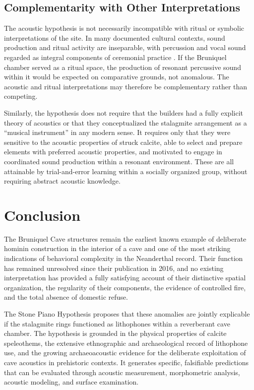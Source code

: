 \documentclass[12pt]{article}
\begin{document}
\subsection{Complementarity with Other Interpretations}

The acoustic hypothesis is not necessarily incompatible with ritual or symbolic interpretations of the site. In many documented cultural contexts, sound production and ritual activity are inseparable, with percussion and vocal sound regarded as integral components of ceremonial practice \citep{Needham1967, Blacking1973}. If the Bruniquel chamber served as a ritual space, the production of resonant percussive sound within it would be expected on comparative grounds, not anomalous. The acoustic and ritual interpretations may therefore be complementary rather than competing.

Similarly, the hypothesis does not require that the builders had a fully explicit theory of acoustics or that they conceptualized the stalagmite arrangement as a ``musical instrument'' in any modern sense. It requires only that they were sensitive to the acoustic properties of struck calcite, able to select and prepare elements with preferred acoustic properties, and motivated to engage in coordinated sound production within a resonant environment. These are all attainable by trial-and-error learning within a socially organized group, without requiring abstract acoustic knowledge.

\section{Conclusion}

The Bruniquel Cave structures remain the earliest known example of deliberate hominin construction in the interior of a cave and one of the most striking indications of behavioral complexity in the Neanderthal record. Their function has remained unresolved since their publication in 2016, and no existing interpretation has provided a fully satisfying account of their distinctive spatial organization, the regularity of their components, the evidence of controlled fire, and the total absence of domestic refuse.

The Stone Piano Hypothesis proposes that these anomalies are jointly explicable if the stalagmite rings functioned as lithophones within a reverberant cave chamber. The hypothesis is grounded in the physical properties of calcite speleothems, the extensive ethnographic and archaeological record of lithophone use, and the growing archaeoacoustic evidence for the deliberate exploitation of cave acoustics in prehistoric contexts. It generates specific, falsifiable predictions that can be evaluated through acoustic measurement, morphometric analysis, acoustic modeling, and surface examination.
\end{document}
